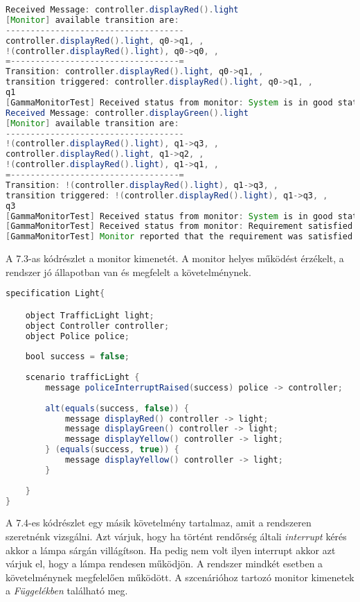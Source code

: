 \begin{lstlisting}[language=java, frame=single, float=ht!, caption={Monitor kimenete.},captionpos=b]
Received Message: controller.displayRed().light
[Monitor] available transition are: 
------------------------------------
controller.displayRed().light, q0->q1, , 
!(controller.displayRed().light), q0->q0, , 
=----------------------------------=
Transition: controller.displayRed().light, q0->q1, , 
transition triggered: controller.displayRed().light, q0->q1, , 
q1
[GammaMonitorTest] Received status from monitor: System is in good state.
Received Message: controller.displayGreen().light
[Monitor] available transition are: 
------------------------------------
!(controller.displayRed().light), q1->q3, , 
controller.displayRed().light, q1->q2, , 
!(controller.displayRed().light), q1->q1, , 
=----------------------------------=
Transition: !(controller.displayRed().light), q1->q3, , 
transition triggered: !(controller.displayRed().light), q1->q3, , 
q3
[GammaMonitorTest] Received status from monitor: System is in good state.
[GammaMonitorTest] Received status from monitor: Requirement satisfied
[GammaMonitorTest] Monitor reported that the requirement was satisfied
\end{lstlisting}

A 7.3-as kódrészlet a monitor kimenetét.
A monitor helyes működést érzékelt, a rendszer jó állapotban van és megfelelt a követelménynek.

\begin{lstlisting}[language=java, frame=single, float=ht!, caption={Szenárió szöveges leírása.},captionpos=b]
specification Light{

    object TrafficLight light;
    object Controller controller;
    object Police police;
    
    bool success = false;
    
    scenario trafficLight {
        message policeInterruptRaised(success) police -> controller;
        
        alt(equals(success, false)) {
            message displayRed() controller -> light;
            message displayGreen() controller -> light;
            message displayYellow() controller -> light;
        } (equals(success, true)) {
            message displayYellow() controller -> light;
        }
        
    }
}
\end{lstlisting}

A 7.4-es kódrészlet egy másik követelmény tartalmaz, amit a rendszeren szeretnénk vizsgálni.
Azt várjuk, hogy ha történt rendőrség általi \textit{interrupt} kérés akkor a lámpa sárgán villágítson.
Ha pedig nem volt ilyen interrupt akkor azt várjuk el, hogy a lámpa rendesen működjön.
A rendszer mindkét esetben a követelménynek megfelelően működött.
A szcenárióhoz tartozó monitor kimenetek a \textit{Függelékben} található meg.